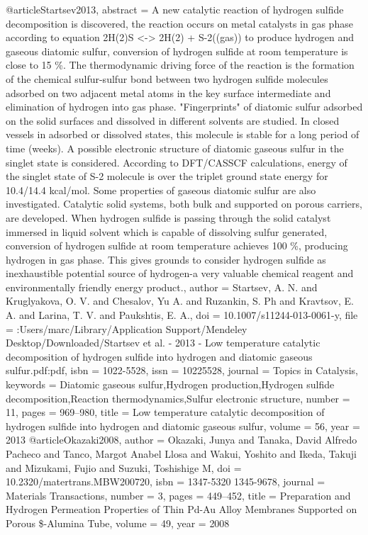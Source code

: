 @article{Startsev2013,
abstract = {A new catalytic reaction of hydrogen sulfide decomposition is discovered, the reaction occurs on metal catalysts in gas phase according to equation 2H(2)S {\textless}-{\textgreater} 2H(2) + S-2((gas)) to produce hydrogen and gaseous diatomic sulfur, conversion of hydrogen sulfide at room temperature is close to 15 {\%}. The thermodynamic driving force of the reaction is the formation of the chemical sulfur-sulfur bond between two hydrogen sulfide molecules adsorbed on two adjacent metal atoms in the key surface intermediate and elimination of hydrogen into gas phase. "Fingerprints" of diatomic sulfur adsorbed on the solid surfaces and dissolved in different solvents are studied. In closed vessels in adsorbed or dissolved states, this molecule is stable for a long period of time (weeks). A possible electronic structure of diatomic gaseous sulfur in the singlet state is considered. According to DFT/CASSCF calculations, energy of the singlet state of S-2 molecule is over the triplet ground state energy for 10.4/14.4 kcal/mol. Some properties of gaseous diatomic sulfur are also investigated. Catalytic solid systems, both bulk and supported on porous carriers, are developed. When hydrogen sulfide is passing through the solid catalyst immersed in liquid solvent which is capable of dissolving sulfur generated, conversion of hydrogen sulfide at room temperature achieves 100 {\%}, producing hydrogen in gas phase. This gives grounds to consider hydrogen sulfide as inexhaustible potential source of hydrogen-a very valuable chemical reagent and environmentally friendly energy product.},
author = {Startsev, A. N. and Kruglyakova, O. V. and Chesalov, Yu A. and Ruzankin, S. Ph and Kravtsov, E. A. and Larina, T. V. and Paukshtis, E. A.},
doi = {10.1007/s11244-013-0061-y},
file = {:Users/marc/Library/Application Support/Mendeley Desktop/Downloaded/Startsev et al. - 2013 - Low temperature catalytic decomposition of hydrogen sulfide into hydrogen and diatomic gaseous sulfur.pdf:pdf},
isbn = {1022-5528},
issn = {10225528},
journal = {Topics in Catalysis},
keywords = {Diatomic gaseous sulfur,Hydrogen production,Hydrogen sulfide decomposition,Reaction thermodynamics,Sulfur electronic structure},
number = {11},
pages = {969--980},
title = {{Low temperature catalytic decomposition of hydrogen sulfide into hydrogen and diatomic gaseous sulfur}},
volume = {56},
year = {2013}
}
@article{Okazaki2008,
author = {Okazaki, Junya and Tanaka, David Alfredo Pacheco and Tanco, Margot Anabel Llosa and Wakui, Yoshito and Ikeda, Takuji and Mizukami, Fujio and Suzuki, Toshishige M},
doi = {10.2320/matertrans.MBW200720},
isbn = {1347-5320 1345-9678},
journal = {Materials Transactions},
number = {3},
pages = {449--452},
title = {{Preparation and Hydrogen Permeation Properties of Thin Pd-Au Alloy Membranes Supported on Porous {\$}\alpha{\$}-Alumina Tube}},
volume = {49},
year = {2008}
}

